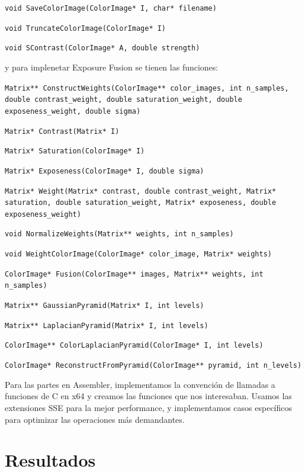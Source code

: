 \documentclass[a4paper,10pt]{article}
\begin{document}
            \texttt{void SaveColorImage(ColorImage* I, char* filename)}

            \texttt{void TruncateColorImage(ColorImage* I)}

            \texttt{void SContrast(ColorImage* A, double strength)}
            
            \bigskip
            y para implenetar Exposure Fusion se tienen las funciones:
            
            \texttt{Matrix** ConstructWeights(ColorImage** color\_images, int n\_samples, double contrast\_weight, double saturation\_weight, double exposeness\_weight, double sigma)}
            
            \texttt{Matrix* Contrast(Matrix* I)}

            \texttt{Matrix* Saturation(ColorImage* I)}

            \texttt{Matrix* Exposeness(ColorImage* I, double sigma)}

            \texttt{Matrix* Weight(Matrix* contrast, double contrast\_weight, Matrix* saturation, double saturation\_weight, Matrix* exposeness, double exposeness\_weight)}

            \texttt{void NormalizeWeights(Matrix** weights, int n\_samples)}

            \texttt{void WeightColorImage(ColorImage* color\_image, Matrix* weights)}

            \texttt{ColorImage* Fusion(ColorImage** images, Matrix** weights, int n\_samples)}

            \texttt{Matrix** GaussianPyramid(Matrix* I, int levels)}

            \texttt{Matrix** LaplacianPyramid(Matrix* I, int levels)}

            \texttt{ColorImage** ColorLaplacianPyramid(ColorImage* I, int levels)}

            \texttt{ColorImage* ReconstructFromPyramid(ColorImage** pyramid, int n\_levels)}
            
            \bigskip
            Para las partes en Assembler, implementamos la convención de llamadas a funciones de C en x64 y creamos las funciones que nos interesaban. Usamos las extensiones SSE para la mejor performance, y implementamos casos específicos para optimizar las operaciones más demandantes.

    \section{Resultados}
\end{document}
